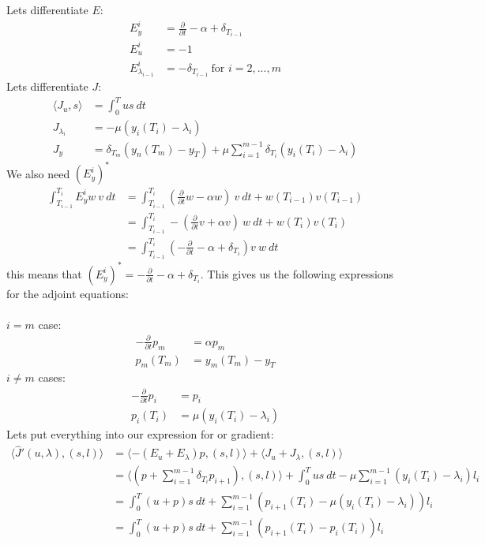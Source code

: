\documentclass[11pt,a4paper]{article}
\begin{document}
Lets differentiate $E$:
\begin{align*}
E_y^i &= \frac{\partial }{\partial t} - \alpha + \delta_{T_{i-1}} \\
E_u^i &= -1 \\
E_{\lambda_{i-1}}^i &= -\delta_{T_{i-1}} \ \text{for $i=2,...,m$}
\end{align*}
Lets differentiate $J$:
\begin{align*}
\langle J_u,s\rangle &= \int_0^T us \ dt \\
J_{\lambda_i}&= -\mu(y_{i}(T_i)-\lambda_i) \\
J_y &= \delta_{T_{m}}(y_n(T_{m})-y_T) + \mu \sum_{i=1}^{m-1} \delta_{T_{i}}(y_{i}(T_i)-\lambda_i ) 
\end{align*}
We also need $(E_y^i)^*$
\begin{align*}
\int_{T_{i-1}}^{T_{i}} E_y^iw \ v \ dt & = \int_{T_{i-1}}^{T_{i}} (\frac{\partial }{\partial t}w -\alpha w) \ v \ dt + w(T_{i-1})v(T_{i-1}) \\
&= \int_{T_{i-1}}^{T_{i}}-(\frac{\partial }{\partial t}v+\alpha v) \ w \ dt + w(T_{i})v(T_{i}) \\
&= \int_{T_{i-1}}^{T_{i}} (-\frac{\partial }{\partial t}-\alpha + \delta_{T_{i}})v \ w \ dt
\end{align*} 
this means that $(E_y^i)^*=-\frac{\partial }{\partial t}-\alpha + \delta_{T_{i}}$. This gives us the following expressions for the adjoint equations:
\\
\\
$i=m$ case:
\begin{align*}
-\frac{\partial }{\partial t}p_m &=\alpha p_m  \\
p_m(T_{m}) &= y_m(T_{m})-y_T
\end{align*}
$i\neq m$ cases:
\begin{align*}
-\frac{\partial }{\partial t}p_i &=p_i  \\
p_i(T_{i}) &= \mu(y_{i}(T_{i})-\lambda_{i} )
\end{align*}
Lets put everything into our expression for or gradient:
\begin{align*}
\langle \hat{J}'(u,\lambda), (s,l)\rangle&=\langle -(E_u+E_{\lambda})p, (s,l)\rangle + \langle J_u+J_{\lambda}, (s,l)\rangle \\
&= \langle (p+\sum_{i=1}^{m-1} \delta_{T_i}p_{i+1}) , (s,l)\rangle+ \int_0^T us \ dt - \mu \sum_{i=1}^{m-1}(y_{i}(T_i)-\lambda_i)l_i\\
&=\int_0^T (u+p)s \ dt +\sum_{i=1}^{m-1}(p_{i+1}(T_i) -\mu(y_{i}(T_i)-\lambda_i) )l_i \\
&= \int_0^T (u+p)s \ dt +\sum_{i=1}^{m-1}(p_{i+1}(T_i) -p_{i}(T_i) )l_i
\end{align*} 
\end{document}
